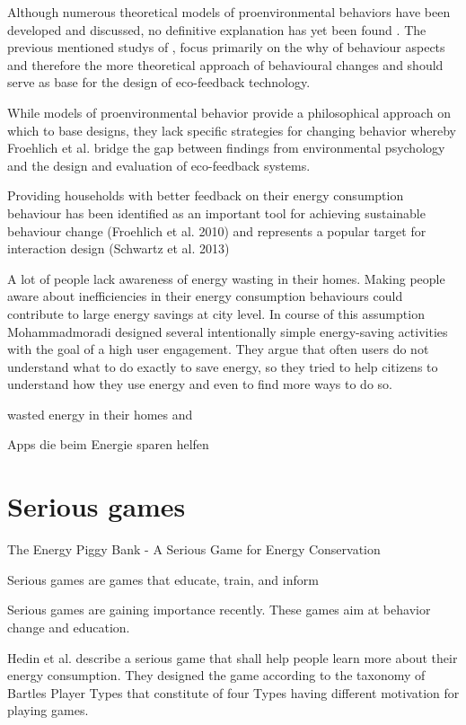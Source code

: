  Although numerous theoretical models of proenvironmental behaviors have been developed and discussed, no definitive explanation has yet been found \cite{kollmuss2002mind}. The previous mentioned studys of \cite{froehlich2010design}, \cite{kollmuss2002mind} focus primarily on the why of behaviour aspects and therefore the more theoretical approach of behavioural changes and should serve as base for the design of eco-feedback technology.



While models of proenvironmental behavior provide a philosophical approach on which to base designs, they lack specific strategies for changing behavior whereby Froehlich et al. \cite{froehlich2010design} bridge the gap between findings from environmental psychology and the design and evaluation of eco-feedback systems.

Providing households with better feedback on their energy consumption behaviour has been identified as an important tool for achieving sustainable behaviour change (Froehlich et al. 2010) and represents a popular
target for interaction design (Schwartz et al. 2013)

A lot of people lack awareness of energy wasting in their homes. Making people aware about inefficiencies in their energy consumption behaviours could contribute to large energy savings at city level. In course of this assumption Mohammadmoradi \cite{mohammadmoradi2017effectiveness} designed several intentionally simple energy-saving activities with the goal of a high user engagement. They argue that often users do not understand what to do exactly to save energy, so they tried to help citizens to understand how they use energy and even to find more ways to do so.

wasted energy in their homes and 

Apps die beim Energie sparen helfen

\section{Serious games}

The Energy Piggy Bank - A Serious Game for Energy Conservation

Serious games are games that educate, train, and inform

Serious games are gaining importance recently. These games aim at behavior change and education.

Hedin et al. \cite{Bjorn1165339} describe a serious game that shall help people learn more about their energy consumption. They designed the game according to the taxonomy of Bartles Player Types that constitute of four Types having different motivation for playing games.


